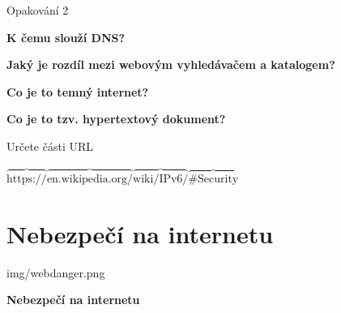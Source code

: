 \documentclass[aspectratio=169]{beamer}
\begin{document}
\begin{frame}{Opakování 2}
    \begin{cardTiny}
        \begin{center}
            \textbf{K čemu slouží DNS?}
        \end{center}
    \end{cardTiny}
    \begin{cardTiny}
        \begin{center}
            \textbf{Jaký je rozdíl mezi webovým vyhledávačem a katalogem?}
        \end{center}
    \end{cardTiny}
    \begin{cardTiny}
        \begin{center}
            \textbf{Co je to temný internet?}
        \end{center}
    \end{cardTiny}
    \begin{cardTiny}
        \begin{center}
            \textbf{Co je to tzv. hypertextový dokument?}
        \end{center}
    \end{cardTiny}
\end{frame}

\begin{frame}{Určete části URL} 
    \begin{cardTiny}
        \begin{center}
            $ \overbrace{\text{https://}}^{\text{ }}
            \overbrace{\text{en.wikipedia.org/}}^{\text{ }}
            \overbrace{\text{wiki/IPv6/}}^{\text{ }}
            \overbrace{\text{\#Security}}^{\text{ }} $
        \end{center}
    \end{cardTiny}
\end{frame}



\section{Nebezpečí na internetu}

\begin{frameImg}[width]{img/webdanger.png}
    \vspace*{60mm}
    \begin{cardTiny}
        \vspace*{\fill}
        \begin{center}
            \textbf{Nebezpečí na internetu}
        \end{center}
    \end{cardTiny}
\end{frameImg}
\end{document}
